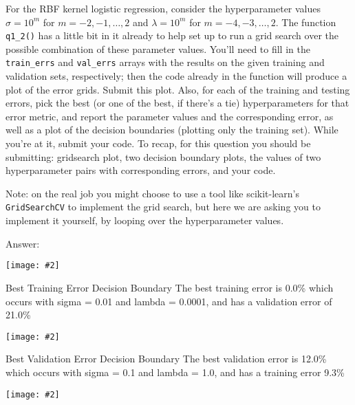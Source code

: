 \documentclass{article}
\newcommand{\blu}[1]{{\textcolor{blu}{#1}}}
\newcommand{\gre}[1]{\textcolor{gre}{#1}}
\newcommand\ans[1]{\par\gre{Answer: #1}}
\let\ask\blu
\newcommand{\centerfig}[2]{\begin{center}\texttt{[image: \#2]}\end{center}}
\begin{document}
For the RBF kernel logistic regression, consider the hyperparameter values $\sigma=10^m$ for $m=-2,-1,\ldots,2$ and $\lambda=10^m$ for $m=-4,-3,\ldots,2$.
The function \verb|q1_2()| has a little bit in it already to help set up to run a grid search over the possible combination of these parameter values.
You'll need to fill in the \verb|train_errs| and \verb|val_errs| arrays
with the results on the given training and validation sets, respectively;
then the code already in the function will produce a plot of the error grids.
\ask{Submit this plot}.
Also, for each of the training and testing errors,
pick the best (or one of the best, if there's a tie) hyperparameters for that error metric,
and \ask{report the parameter values and the corresponding error, as well as a plot of the decision boundaries (plotting only the training set)}.
While you're at it, \ask{submit your code}.
To recap, for this question you should be submitting: gridsearch plot,
two decision boundary plots,
the values of two hyperparameter pairs with corresponding errors,
and your code. 


Note: on the real job you might choose to use a tool like scikit-learn's \texttt{GridSearchCV} to implement the grid search, but here we are asking you to implement it yourself, by looping over the hyperparameter values.

\ans{}
\centerfig{1.0}{figs/logRegRBF_grids.png}
\gre{Best Training Error Decision Boundary \newline The best training error is 0.0\% which occurs with sigma = 0.01 and lambda = 0.0001, and has a validation error of 21.0\%}
\newline
\centerfig{0.5}{figs/logRegGaussianRBFBestTrainError.png}
\gre{Best Validation Error Decision Boundary \newline The best validation error is 12.0\% which occurs with sigma = 0.1 and lambda = 1.0, and has a training error 9.3\%}
\centerfig{0.5}{figs/logRegGaussianRBFBestValError.png}
\end{document}
